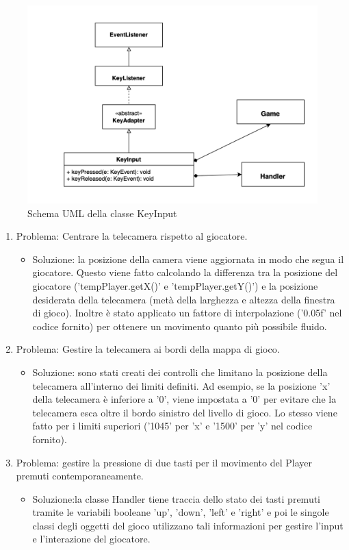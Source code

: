 \documentclass[a4paper,12pt]{report}
\begin{document}
\begin{figure}[H]
	\centering{}
\includegraphics[width=\textwidth]{img/KeyInput.png}
	\caption{Schema UML della classe KeyInput}
\end{figure}

\begin{enumerate}
	\item Problema: Centrare la telecamera rispetto al giocatore.
	\begin{itemize}
		\item  Soluzione: la posizione della camera viene aggiornata in modo che segua il giocatore. Questo viene fatto calcolando la differenza tra la posizione del giocatore ('tempPlayer.getX()' e 'tempPlayer.getY()') e la posizione desiderata della telecamera (metà della larghezza e altezza della finestra di gioco). 
		Inoltre è stato applicato un fattore di interpolazione ('0.05f' nel codice fornito) per ottenere un movimento quanto più possibile  fluido.
	\end{itemize}
	\item Problema: Gestire la telecamera ai bordi della mappa di gioco.
	\begin{itemize}
		\item Soluzione: sono stati creati dei controlli che limitano la posizione della telecamera all'interno dei limiti definiti. 
		Ad esempio, se la posizione 'x' della telecamera è inferiore a '0', viene impostata a '0' per evitare che la telecamera esca oltre il bordo sinistro del livello di gioco. Lo stesso viene fatto per i limiti superiori ('1045' per 'x' e '1500' per 'y' nel codice fornito).
	\end{itemize}
	\item Problema: gestire la pressione di due tasti per il movimento del Player premuti contemporaneamente.
	\begin{itemize}
		\item  Soluzione:la classe Handler tiene traccia dello stato dei tasti premuti tramite le variabili booleane 'up', 'down', 'left' e 'right' e poi le singole classi degli oggetti del gioco utilizzano tali informazioni per gestire l'input e l'interazione del giocatore.
	\end{itemize}
\end{enumerate}
%
\end{document}
